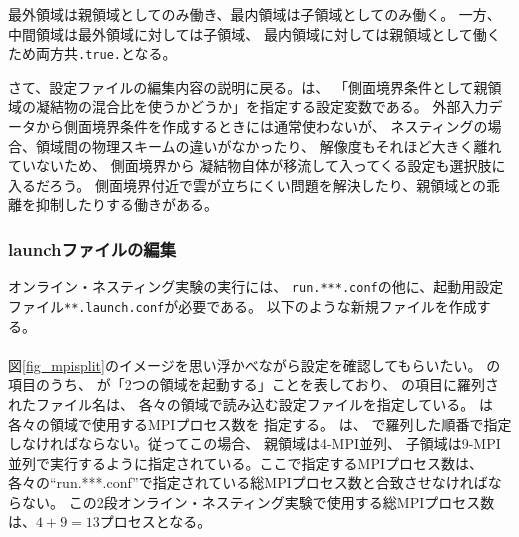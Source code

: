 \noindent 最外領域は親領域としてのみ働き、最内領域は子領域としてのみ働く。
一方、中間領域は最外領域に対しては子領域、
最内領域に対しては親領域として働くため両方共\verb|.true.|となる。

さて、設定ファイルの編集内容の説明に戻る。は、
「側面境界条件として親領域の凝結物の混合比を使うかどうか」を指定する設定変数である。
外部入力データから側面境界条件を作成するときには通常使わないが、
ネスティングの場合、領域間の物理スキームの違いがなかったり、
解像度もそれほど大きく離れていないため、
側面境界から
凝結物自体が移流して入ってくる設定も選択肢に入るだろう。
側面境界付近で雲が立ちにくい問題を解決したり、親領域との乖離を抑制したりする働きがある。


\subsubsection{launchファイルの編集}
\label{subsubsec:launch}
オンライン・ネスティング実験の実行には、
\verb|run.***.conf|の他に、起動用設定ファイル\verb|**.launch.conf|が必要である。
以下のような新規ファイルを作成する。\\

\\

\noindent 図\ref{fig_mpisplit}のイメージを思い浮かべながら設定を確認してもらいたい。
の項目のうち、
が「2つの領域を起動する」ことを表しており、
の項目に羅列されたファイル名は、
各々の領域で読み込む設定ファイルを指定している。
は各々の領域で使用するMPIプロセス数を
指定する。
は、
で羅列した順番で指定しなければならない。従ってこの場合、
親領域は4-MPI並列、
子領域は9-MPI並列で実行するように指定されている。ここで指定するMPIプロセス数は、
各々の``run.***.conf''で指定されている総MPIプロセス数と合致させなければならない。
この2段オンライン・ネスティング実験で使用する総MPIプロセス数は、$4 + 9 = 13$プロセスとなる。

